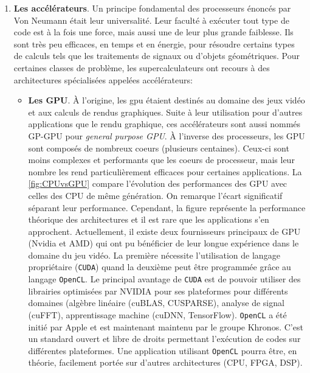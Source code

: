 \begin{enumerate}
            \item \textbf{Les accélérateurs}. Un principe fondamental des processeurs énoncés par Von Neumann était leur universalité. Leur faculté à exécuter tout type de code est à la fois une force, mais aussi une de leur plus grande faiblesse. Ils sont très peu efficaces, en temps et en énergie, pour résoudre certains types de calculs tels que les traitements de signaux ou d'objets géométriques. Pour certaines classes de problème, les supercalculateurs ont recours à des architectures spécialisées appelées accélérateurs:
                \begin{itemize}
    
                    \item\textbf{Les GPU}. À l'origine, les \gls{gpu} étaient destinés au domaine des jeux vidéo et aux calculs de rendus graphiques. Suite à leur utilisation pour d'autres applications que le rendu graphique, ces accélérateurs sont aussi nommés GP-GPU pour \textit{general purpose GPU}. À l'inverse des processeurs, les GPU sont composés de nombreux coeurs (plusieurs centaines). Ceux-ci sont moins complexes et performants que les coeurs de processeur, mais leur nombre les rend particulièrement efficaces pour certaines applications. La \autoref{fig:CPUvsGPU} compare l'évolution des performances des GPU avec celles des CPU de même génération. On remarque l'écart significatif séparant leur performance. Cependant, la figure représente la performance théorique des architectures et il est rare que les applications s'en approchent. 
                    Actuellement, il existe deux fournisseurs principaux de GPU (Nvidia et AMD) qui ont pu bénéficier de leur longue expérience dans le domaine du jeu vidéo. La première nécessite l'utilisation de langage propriétaire (\verb|CUDA|) quand la deuxième peut être programmée grâce au langage \verb|OpenCL|. Le principal avantage de \verb|CUDA| est de pouvoir utiliser des librairies optimisées par NVIDIA pour ses plateformes pour différents domaines (algèbre linéaire (cuBLAS, CUSPARSE), analyse de signal (cuFFT), apprentissage machine (cuDNN, TensorFlow). 
                    \verb|OpenCL| a été initié par Apple et est maintenant maintenu par le groupe Khronos. C'est un standard ouvert et libre de droits permettant l'exécution de codes sur différentes plateformes. Une application utilisant \verb|OpenCL| pourra être, en théorie, facilement portée sur d'autres architectures (CPU, FPGA, DSP). 
                    

\end{itemize}
\end{enumerate}
